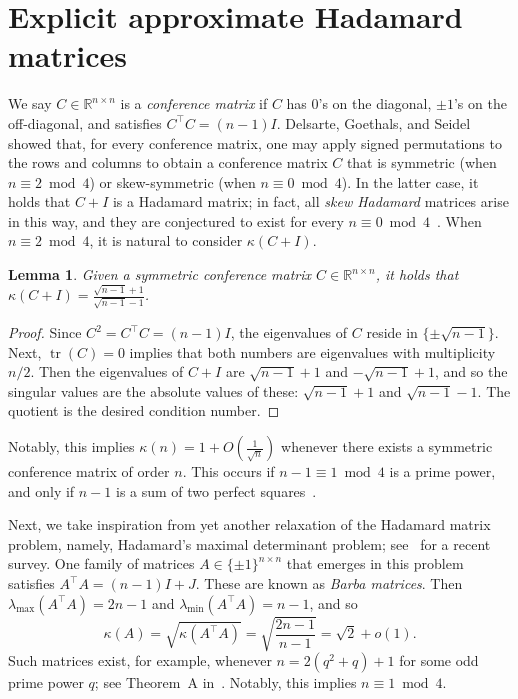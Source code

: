 \documentclass[11pt]{article}
\theoremstyle{plain}
\newtheorem{lemma}[theorem]{Lemma}
\theoremstyle{definition}
\begin{document}
\section{Explicit approximate Hadamard matrices}
\label{sec.explicit families}

We say $C\in\mathbb{R}^{n\times n}$ is a \textit{conference matrix} if $C$ has $0$'s on the diagonal, $\pm1$'s on the off-diagonal, and satisfies $C^\top C=(n-1)I$.
Delsarte, Goethals, and Seidel~\cite{DelsarteGS:71} showed that, for every conference matrix, one may apply signed permutations to the rows and columns to obtain a conference matrix $C$ that is symmetric (when $n\equiv 2\bmod 4$) or skew-symmetric (when $n\equiv 0\bmod4$).
In the latter case, it holds that $C+I$ is a Hadamard matrix; in fact, all \textit{skew Hadamard} matrices arise in this way, and they are conjectured to exist for every $n\equiv0\bmod4$~\cite{Wallis:71}.
When $n\equiv2\bmod4$, it is natural to consider $\kappa(C+I)$.

\begin{lemma}
Given a symmetric conference matrix $C\in\mathbb{R}^{n\times n}$, it holds that $\kappa(C+I)=\frac{\sqrt{n-1}+1}{\sqrt{n-1}-1}$.
\end{lemma}

\begin{proof}
Since $C^2=C^\top C=(n-1)I$, the eigenvalues of $C$ reside in $\{\pm\sqrt{n-1}\}$.
Next, $\operatorname{tr}(C)=0$ implies that both numbers are eigenvalues with multiplicity $n/2$.
Then the eigenvalues of $C+I$ are $\sqrt{n-1}+1$ and $-\sqrt{n-1}+1$, and so the singular values are the absolute values of these: $\sqrt{n-1}+1$ and $\sqrt{n-1}-1$.
The quotient is the desired condition number.
\end{proof}

Notably, this implies $\kappa(n)=1+O(\frac{1}{\sqrt{n}})$ whenever there exists a symmetric conference matrix of order $n$.
This occurs if $n-1\equiv 1\bmod 4$ is a prime power, and only if $n-1$ is a sum of two perfect squares~\cite{Belevitch:50,BaloninS:online}.

Next, we take inspiration from yet another relaxation of the Hadamard matrix problem, namely, Hadamard's maximal determinant problem; see~\cite{BrowneEHC:21} for a recent survey.
One family of matrices $A\in\{\pm1\}^{n\times n}$ that emerges in this problem satisfies $A^\top A=(n-1)I+J$.
These are known as \textit{Barba matrices}.
Then $\lambda_{\max}(A^\top A)=2n-1$ and $\lambda_{\min}(A^\top A)=n-1$, and so 
\[
\kappa(A)
=\sqrt{\kappa(A^\top A)}
=\sqrt{\frac{2n-1}{n-1}}=\sqrt{2}+o(1).
\]
Such matrices exist, for example, whenever $n=2(q^2+q)+1$ for some odd prime power $q$; see Theorem~A in~\cite{NeubauerR:97}.
Notably, this implies $n\equiv 1\bmod 4$.
\end{document}
